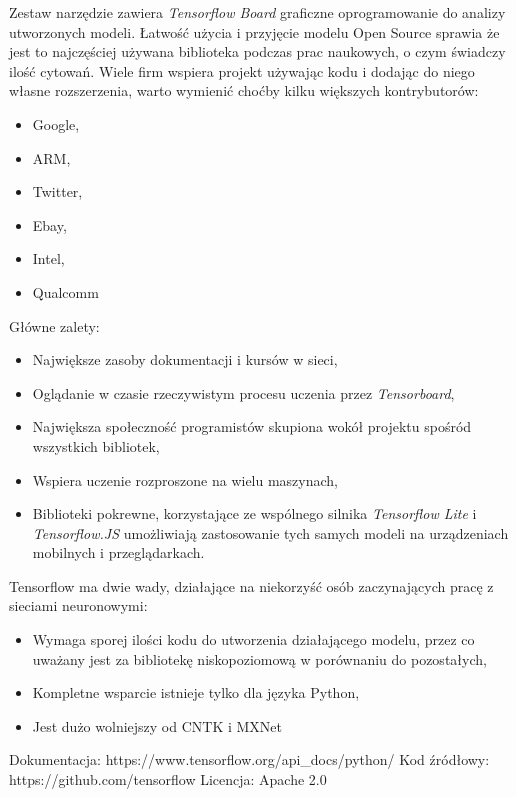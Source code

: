 \documentclass[12pt,a4paper,twoside,titlepage,openright]{book}
\begin{document}
Zestaw narzędzie zawiera \textit{Tensorflow Board} graficzne oprogramowanie do analizy utworzonych modeli. Łatwość użycia i przyjęcie modelu Open Source sprawia że jest to najczęściej używana biblioteka podczas prac naukowych, o czym świadczy ilość cytowań\cite{siteTensorflowCitations}. Wiele firm wspiera projekt używając kodu i dodając do niego własne rozszerzenia, warto wymienić choćby kilku większych kontrybutorów:
\begin{itemize}
\item Google,
\item ARM,
\item Twitter,
\item Ebay,
\item Intel,
\item Qualcomm
\end{itemize}

Główne zalety:
\begin{itemize}
\item Największe zasoby dokumentacji i kursów w sieci,
\item Oglądanie w czasie rzeczywistym procesu uczenia przez \textit{Tensorboard},
\item Największa społeczność programistów skupiona wokół projektu spośród wszystkich bibliotek,
\item Wspiera uczenie rozproszone na wielu maszynach,
\item Biblioteki pokrewne, korzystające ze wspólnego silnika \textit{Tensorflow Lite} i \textit{Tensorflow.JS} umożliwiają zastosowanie tych samych modeli na urządzeniach mobilnych i przeglądarkach.
\end{itemize}

Tensorflow ma dwie wady, działające na niekorzyść osób zaczynających pracę z sieciami neuronowymi:
\begin{itemize}
\item Wymaga sporej ilości kodu do utworzenia działającego modelu, przez co uważany jest za bibliotekę niskopoziomową w porównaniu do pozostałych,
\item Kompletne wsparcie istnieje tylko dla języka Python, 
\item Jest dużo wolniejszy od CNTK i MXNet \cite{DBLP:journals/corr/ShiWXC16}
\end{itemize}

\noindent
\newline 
Dokumentacja: https://www.tensorflow.org/api\_docs/python/
\newline 
Kod źródłowy: https://github.com/tensorflow
\newline 
Licencja: Apache 2.0
\end{document}
